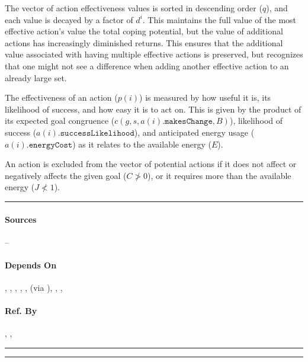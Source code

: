 The vector of action effectiveness values is sorted in descending order ($q$),
and each value is decayed by a factor of $d^i$. This maintains the full value
of the most effective action's value the total coping potential, but the value
of additional actions has increasingly diminished returns. This ensures that the
additional value associated with having multiple effective actions is
preserved, but recognizes that one might not see a difference when adding
another effective action to an already large set.

The effectiveness of an action ($p(i)$) is measured by how useful it is, its
likelihood of success, and how easy it is to act on. This is given by the
product of its expected goal congruence ($c(g, s, a(i).\mathtt{makesChange},
B)$), likelihood of success ($a(i).\mathtt{successLikelihood}$), and
anticipated energy usage ($a(i).\mathtt{energyCost}$) as it relates to the
available energy ($E$).

An action is excluded from the vector of potential actions if it does not
affect or negatively affects the given goal ($C \not > 0$), or it requires more
than the available energy ($J \not < 1$). \\\hrule

\paragraph{Sources} --

\paragraph{Depends On} , , , 
,  ,  (via 
), , , 

\paragraph{Ref. By} , ,
 \\\hrule\vspace{0.5mm}\hrule

~\newline

